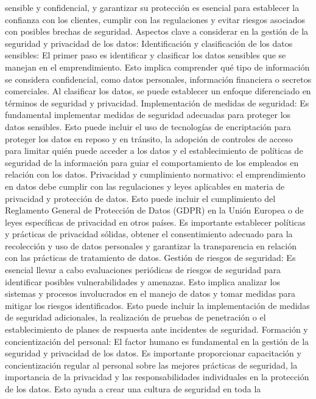 \documentclass[
  letterpaper,
  DIV=11,
  numbers=noendperiod]{scrreprt}
\begin{document}
sensible y confidencial, y garantizar su protección es esencial para
establecer la confianza con los clientes, cumplir con las regulaciones y
evitar riesgos asociados con posibles brechas de seguridad. Aspectos
clave a considerar en la gestión de la seguridad y privacidad de los
datos: Identificación y clasificación de los datos sensibles: El primer
paso es identificar y clasificar los datos sensibles que se manejan en
el emprendimiento. Esto implica comprender qué tipo de información se
considera confidencial, como datos personales, información financiera o
secretos comerciales. Al clasificar los datos, se puede establecer un
enfoque diferenciado en términos de seguridad y privacidad.
Implementación de medidas de seguridad: Es fundamental implementar
medidas de seguridad adecuadas para proteger los datos sensibles. Esto
puede incluir el uso de tecnologías de encriptación para proteger los
datos en reposo y en tránsito, la adopción de controles de acceso para
limitar quién puede acceder a los datos y el establecimiento de
políticas de seguridad de la información para guiar el comportamiento de
los empleados en relación con los datos. Privacidad y cumplimiento
normativo: el emprendimiento en datos debe cumplir con las regulaciones
y leyes aplicables en materia de privacidad y protección de datos. Esto
puede incluir el cumplimiento del Reglamento General de Protección de
Datos (GDPR) en la Unión Europea o de leyes específicas de privacidad en
otros países. Es importante establecer políticas y prácticas de
privacidad sólidas, obtener el consentimiento adecuado para la
recolección y uso de datos personales y garantizar la transparencia en
relación con las prácticas de tratamiento de datos. Gestión de riesgos
de seguridad: Es esencial llevar a cabo evaluaciones periódicas de
riesgos de seguridad para identificar posibles vulnerabilidades y
amenazas. Esto implica analizar los sistemas y procesos involucrados en
el manejo de datos y tomar medidas para mitigar los riesgos
identificados. Esto puede incluir la implementación de medidas de
seguridad adicionales, la realización de pruebas de penetración o el
establecimiento de planes de respuesta ante incidentes de seguridad.
Formación y concientización del personal: El factor humano es
fundamental en la gestión de la seguridad y privacidad de los datos. Es
importante proporcionar capacitación y concientización regular al
personal sobre las mejores prácticas de seguridad, la importancia de la
privacidad y las responsabilidades individuales en la protección de los
datos. Esto ayuda a crear una cultura de seguridad en toda la
\end{document}
